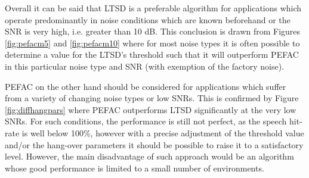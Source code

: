 Overall it can be said that LTSD is a preferable algorithm for applications which operate predominantly in noise conditions which are known beforehand or the SNR is very high, i.e. greater than 10 dB. This conclusion is drawn from Figures \ref{fig:pefacm5} and \ref{fig:pefacm10} where for most noise types it is often possible to determine a value for the LTSD's threshold such that it will outperform PEFAC in this particular noise type and SNR (with exemption of the factory noise).

PEFAC on the other hand should be considered for applications which suffer from a variety of changing noise types or low SNRs. This is confirmed by Figure \ref{fig:diffhangpars} where PEFAC outperforms LTSD significantly at the very low SNRs. For such conditions, the performance is still not perfect, as the speech hit-rate is well below 100\%, however with a precise adjustment of the threshold value and/or the hang-over parameters it should be possible to raise it to a satisfactory level. However, the main disadvantage of such approach would be an algorithm whose good performance is limited to a small number of environments.